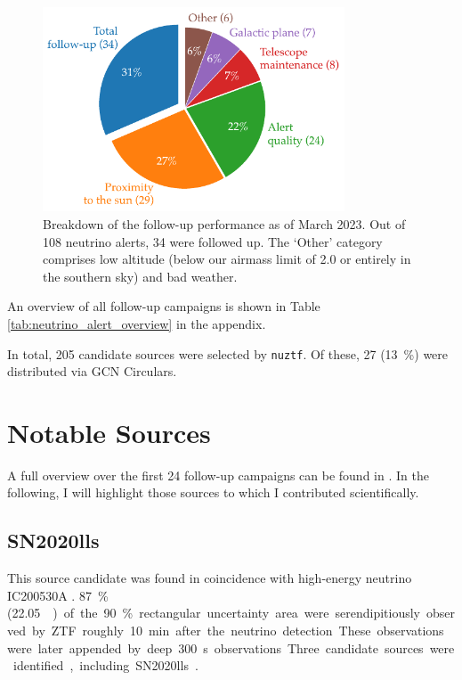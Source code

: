 \documentclass[
    a4paper, %
    fontsize=10pt, %
    twoside=true, %
    numbers=noenddot, %
    fontmethod=tex,
]{kaobook}
\begin{document}
\begin{figure}[h!]
    \includegraphics[width=0.8\textwidth]{fu/follow_up_overview.pdf}
    \caption[Follow-up performance]{Breakdown of the follow-up performance as of March 2023. Out of 108 neutrino alerts, 34 were followed up. The `Other' category comprises low altitude (below our airmass limit of 2.0 or entirely in the southern sky) and bad weather.}
\end{figure}

An overview of all follow-up campaigns is shown in Table \ref{tab:neutrino_alert_overview} in the appendix.

In total, 205 candidate sources were selected by \texttt{nuztf}. Of these, 27 (\SI{13}{\percent}) were distributed via GCN Circulars.

\section{Notable Sources}
A full overview over the first 24 follow-up campaigns can be found in . In the following, I will highlight those sources to which I contributed scientifically.

\subsection{SN2020lls} \label{SN2020lls}
This source candidate was found in coincidence with high-energy neutrino IC200530A . \SI{87}{\percent} (\SI{22.05}{\square\deg}) of the \SI{90}{\percent} rectangular uncertainty area were serendipitiously observed by ZTF roughly \SI{10}{\minute} after the neutrino detection. These observations were later appended by deep \SI{300}{\second} observations Three candidate sources were identified, including SN2020lls . 
\end{document}
